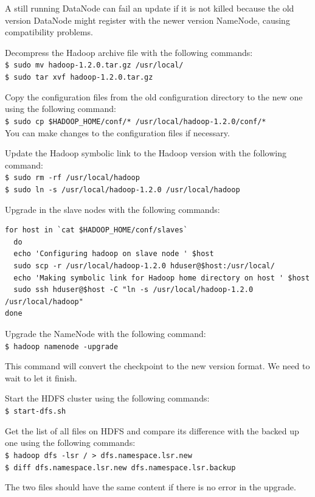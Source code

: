 A still running DataNode can fail an update if it is not killed because the old version DataNode might register with the newer version NameNode, causing compatibility problems.

Decompress the Hadoop archive file with the following commands: \\
\verb|$ sudo mv hadoop-1.2.0.tar.gz /usr/local/| \\
\verb|$ sudo tar xvf hadoop-1.2.0.tar.gz| 

Copy the configuration files from the old configuration directory to the new one using the following command: \\
\verb|$ sudo cp $HADOOP_HOME/conf/* /usr/local/hadoop-1.2.0/conf/*| \\ 

You can make changes to the configuration files if necessary.

Update the Hadoop symbolic link to the Hadoop version with the following command: \\
\verb|$ sudo rm -rf /usr/local/hadoop | \\ 
\verb|$ sudo ln -s /usr/local/hadoop-1.2.0 /usr/local/hadoop | 

Upgrade in the slave nodes with the following commands:
\begin{verbatim}
for host in `cat $HADOOP_HOME/conf/slaves`
  do
  echo 'Configuring hadoop on slave node ' $host
  sudo scp -r /usr/local/hadoop-1.2.0 hduser@$host:/usr/local/
  echo 'Making symbolic link for Hadoop home directory on host ' $host
  sudo ssh hduser@$host -C "ln -s /usr/local/hadoop-1.2.0 /usr/local/hadoop"
done
\end{verbatim}

Upgrade the NameNode with the following command: \\
\verb|$ hadoop namenode -upgrade| 

This command will convert the checkpoint to the new version format. We need to wait to let it finish.

Start the HDFS cluster using the following commands: \\
\verb|$ start-dfs.sh| 

Get the list of all files on HDFS and compare its difference with the backed up one using the following commands:\\
\verb|$ hadoop dfs -lsr / > dfs.namespace.lsr.new| \\
\verb|$ diff dfs.namespace.lsr.new dfs.namespace.lsr.backup| 

The two files should have the same content if there is no error in the upgrade. 

